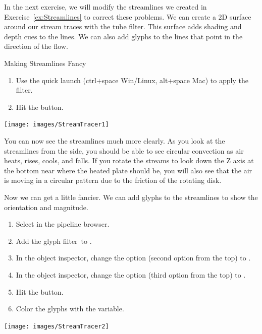 In the next exercise, we will modify the streamlines we created in
Exercise~\ref{ex:Streamlines} to correct these problems.  We can create a
2D surface around our stream traces with the tube filter.  This surface
adds shading and depth cues to the lines.  We can also add glyphs to the
lines that point in the direction of the flow.

\begin{exercise}{Making Streamlines Fancy}
  \label{ex:MakingStreamlinesFancy}%
  \begin{enumerate}
  \item Use the quick launch (ctrl+space Win/Linux, alt+space Mac) to apply
    the  filter.
  \item Hit the \apply button.
    \savecounter
  \end{enumerate}

  \begin{inlinefig}
    \texttt{[image: images/StreamTracer1]}
  \end{inlinefig}

  You can now see the streamlines much more clearly.  As you look at the
  streamlines from the side, you should be able to see circular convection
  as air heats, rises, cools, and falls.  If you rotate the streams to look
  down the Z axis at the bottom near where the heated plate should be, you
  will also see that the air is moving in a circular pattern due to the
  friction of the rotating disk.

  Now we can get a little fancier.  We can add glyphs to the streamlines to
  show the orientation and magnitude.

  \begin{enumerate}
    \restorecounter
  \item Select  in the pipeline browser.
  \item Add the glyph filter~\glyph to .
  \item In the object inspector, change the  option (second
    option from the top) to .
  \item In the object inspector, change the  option (third
    option from the top) to .
  \item Hit the \apply button.
  \item Color the glyphs with the  variable.
  \end{enumerate}

  \begin{inlinefig}
    \texttt{[image: images/StreamTracer2]}
  \end{inlinefig}


\end{exercise}
